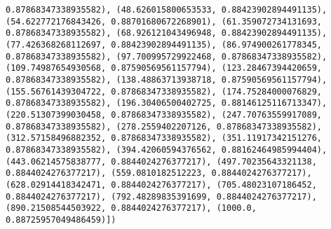 \documentclass[11pt]{article}
\begin{document}
\begin{Verbatim}[commandchars=\\\{\}]
0.87868347338935582), (48.626015800653533, 0.88423902894491135), (54.622772176843426, 0.88701680672268901), (61.359072734131693, 0.87868347338935582), (68.926121043496948, 0.88423902894491135), (77.426368268112697, 0.88423902894491135), (86.974900261778345, 0.87868347338935582), (97.700995729922468, 0.87868347338935582), (109.74987654930568, 0.87590569561157794), (123.28467394420659, 0.87868347338935582), (138.48863713938718, 0.87590569561157794), (155.56761439304722, 0.87868347338935582), (174.75284000076829, 0.87868347338935582), (196.30406500402725, 0.88146125116713347), (220.51307399030458, 0.87868347338935582), (247.70763559917089, 0.87868347338935582), (278.2559402207126, 0.87868347338935582), (312.57158496882352, 0.87868347338935582), (351.11917342151276, 0.87868347338935582), (394.42060594376562, 0.88162464985994404), (443.06214575838777, 0.8844024276377217), (497.70235643321138, 0.8844024276377217), (559.0810182512223, 0.8844024276377217), (628.02914418342471, 0.8844024276377217), (705.48023107186452, 0.8844024276377217), (792.48289835391699, 0.8844024276377217), (890.21508544503922, 0.8844024276377217), (1000.0, 0.88725957049486459)])

\end{Verbatim}
\end{document}

